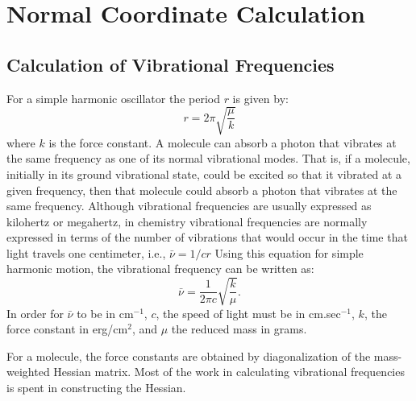 \section{Normal Coordinate Calculation}
\subsection{Calculation of Vibrational Frequencies}
For a simple harmonic oscillator the period $r$ is given by:
$$
r = 2 \pi \sqrt{\frac{\mu}{k}}
$$
where $k$ is the force constant.  A molecule can absorb a photon that vibrates
at the same frequency as one of its normal vibrational modes.  That is, if a
molecule, initially in its ground vibrational state, could be excited so that
it vibrated at   a given frequency, then that molecule could absorb a photon
that vibrates at the same frequency.  Although vibrational frequencies are
usually expressed as kilohertz or megahertz, in chemistry vibrational
frequencies are normally  expressed in terms of the number of vibrations that
would occur in the time that light travels one centimeter, i.e., $\bar{\nu} =
1/cr$ Using this equation for simple harmonic motion, the vibrational frequency
can be written as:
$$
\bar{\nu} = \frac{1}{2\pi c}\sqrt{\frac{k}{\mu}}.
$$
In order for $\bar{\nu}$ to be in cm$^{-1}$, $c$, the speed of light must be in
cm.sec$^{-1}$, $k$, the force constant in erg/cm$^2$, and $\mu$ the reduced
mass in grams.

For a molecule, the force constants are obtained by diagonalization of the
mass-weighted Hessian matrix.  Most of the work in calculating vibrational
frequencies is spent in constructing the Hessian.

